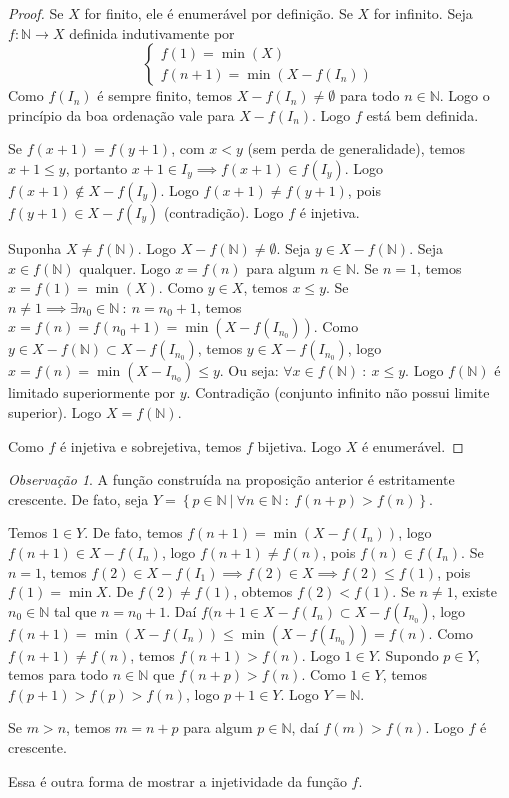 \documentclass{article}
\theoremstyle{theorem}
\theoremstyle{lemma}
\theoremstyle{definition}
\theoremstyle{remark}
\newtheorem{obs}{Observação}[section]
\begin{document}
\begin{proof}
	Se $X$ for finito, ele é enumerável por definição. Se $X$ for infinito. Seja $f:  \mathbb{N} \to X$ definida indutivamente por $$\begin{cases} f(1) = \min (X) \\ 
	f(n+1) = \min( X- f(I_n)) \end{cases}$$
	Como $f(I_n)$ é sempre finito, temos $X-f(I_n) \neq \emptyset$ para todo $n \in \mathbb{N}$. Logo o princípio da boa ordenação vale para $X - f(I_n)$. Logo $f$ está bem definida. 

	Se $f(x+1) = f(y+1)$, com $x<y$ (sem perda de generalidade), temos $x+1 \leq y$, portanto  $x+1 \in I_y \implies f(x+1) \in f(I_y)$. Logo $f(x+1) \not \in X - f(I_y)$. Logo $f(x+1) \neq f(y+1)$, pois $f(y+1) \in X - f(I_y)$ (contradição). Logo $f$ é injetiva.
	
	Suponha $X \neq f(\mathbb{N})$. Logo $X - f(\mathbb{N}) \neq \emptyset$. Seja $y \in X - f(\mathbb{N})$.  Seja $x\in f(\mathbb{N})$ qualquer. Logo $x = f(n)$ para algum $n \in \mathbb{N}$. Se $n = 1$, temos $x = f(1) =  \min(X)$. Como $y \in X$, temos $x \leq y$. Se $n\neq 1 \implies \exists n_0 \in \mathbb{N} \: : \: n = n_0+1$, temos $x = f(n) =  f(n_0+1) = \min (X - f(I_{n_0}))$. Como $y \in X - f(\mathbb{N}) \subset X - f(I_{n_0})$, temos $y \in X - f(I_{n_0})$, logo $x = f(n) = \min( X - I_{n_0}) \leq y$. Ou seja: $\forall x \in f\left(\mathbb{N}\right) \: : \: x\leq y$. Logo $f\left(\mathbb{N}\right)$ é limitado superiormente por $y$.  Contradição (conjunto infinito não possui limite superior). Logo $X = f(\mathbb{N})$.

	Como $f$ é injetiva e sobrejetiva, temos $f$ bijetiva. Logo $X$ é enumerável.

\end{proof}
\begin{obs}
	\label{obsCrescente}
	A função construída na proposição anterior é estritamente crescente. De fato, seja $Y = \left\{ p \in \mathbb{N} \: | \: \forall n \in \mathbb{N} \: : \:  f(n + p) > f(n)\right\}$. 

	Temos $1\in Y$. De fato, temos $f(n+1) =  \min(X - f(I_n))$, logo $f(n+1) \in X - f(I_n)$, logo $f(n+1) \neq f(n)$, pois $f(n) \in f(I_n)$. Se $n=1$, temos $f(2) \in X-f(I_1) \implies f(2) \in X \implies f(2)\leq f(1)$, pois $f(1) =  \min X$. De $f(2) \neq f(1)$, obtemos $f(2) < f(1)$. Se $n \neq 1$, existe $n_0 \in \mathbb{N}$ tal que $n = n_0 +1$. Daí $f(n +1\in X - f(I_n) \subset X - f(I_{n_0})$, logo $f(n+1) = \min(X - f(I_n)) \leq \min(X - f(I_{n_0}))  = f(n)$. Como $f(n+1) \neq f(n)$, temos $f(n+1) > f(n)$. Logo $1\in Y$.
	Supondo $p\in Y$, temos para todo $n\in \mathbb{N}$ que $f(n+p) > f(n)$. Como $1\in Y$, temos $f(p+1) > f(p) > f(n)$, logo $p+1\in Y$. Logo $Y = \mathbb{N}$.

	Se $m>n$, temos $m = n +p$ para algum $p \in \mathbb{N}$, daí $f(m) > f(n)$. Logo $f$ é crescente. 

	Essa é outra forma de mostrar a injetividade da função $f$.
\end{obs}
\end{document}
